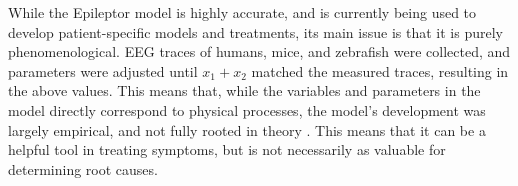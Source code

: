 While the Epileptor model is highly accurate, and is currently being used to develop patient-specific models and treatments, its main issue is that it is purely phenomenological.
EEG traces of humans, mice, and zebrafish were collected, and parameters were adjusted until $x_{1} + x_{2}$ matched the measured traces, resulting in the above values.
This means that, while the variables and parameters in the model directly correspond to physical processes, the model's development was largely empirical, and not fully rooted in theory \cite{Jirsa2014}.
This means that it can be a helpful tool in treating symptoms, but is not necessarily as valuable for determining root causes.

